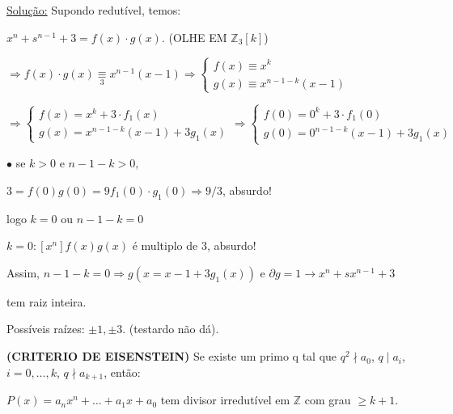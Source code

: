 \documentclass[a4paper,12pt]{article}
\renewcommand{\geq}{\ensuremath{\geqslant}}
\theoremstyle{plain} %
\theoremstyle{definition} %
\theoremstyle{remark} %
\begin{document}
	\begin{framed}
		\underline{Solu\c{c}\~ao:} Supondo redut\'ivel, temos:
		
		\begin{center}
			$x^n+s^{n-1}+3=f(x)\cdot g(x)$. (OLHE EM $\mathds{Z}_3[k]$)
		\end{center}
		
		$\Rightarrow f(x)\cdot g(x)  \underset{3}{\equiv} x^{n-1}(x-1)\Rightarrow \left\{\begin{array}{l}f(x) \equiv x^{k} \\ g(x) \equiv x^{n-1-k}(x-1)\end{array}\right.$
		
		
		\vspace{1ex}
		$\Rightarrow\left\{\begin{array}{l}f(x)=x^{k}+3 \cdot f_{1}(x) \\ g(x)=x^{n-1-k}(x-1)+3 g_{1}(x)\end{array}\right. \Rightarrow \left\{\begin{array}{l}f(0)=0^{k}+3 \cdot f_{1}(0) \\ g(0)=0^{n-1-k}(x-1)+3 g_{1}(x)\end{array}\right.$
		\vspace{1ex}
		
		$\bullet$ \hspace{1em} se $k>0$ e $n-1-k>0$,
		
		\begin{center}
			$3=f(0)g(0)=9f_1(0)\cdot g_1(0)\Rightarrow 9/3$, absurdo!
		\end{center}
		
		logo $k=0$ ou $n-1-k=0$
		
		$k=0: [x^n]f(x)g(x)$ \'e multiplo de 3, absurdo!
		
		Assim, $n-1-k=0\Rightarrow g(x=x-1+3g_1(x))$ e $\partial g=1\rightarrow x^n+sx^{n-1}+3$
		
		tem raiz inteira.
		
		Poss\'iveis ra\'izes: $\pm 1, \pm 3$. (testardo n\~ao d\'a).
	\end{framed}
	
	\textbf{(CRITERIO DE EISENSTEIN)} Se existe um primo q tal que $q^2 \nmid a_0$, $q\mid a_i$, $i=0, \dotso, k$, $q\nmid a_{k+1}$, ent\~ao:
	
	$P(x)=a_{n} x^{n}+\ldots+a_{1} x+a_{0}$ tem divisor irredut\'ivel em $\mathds{Z}$ com grau $\geq k+1$.
	
\end{document}
